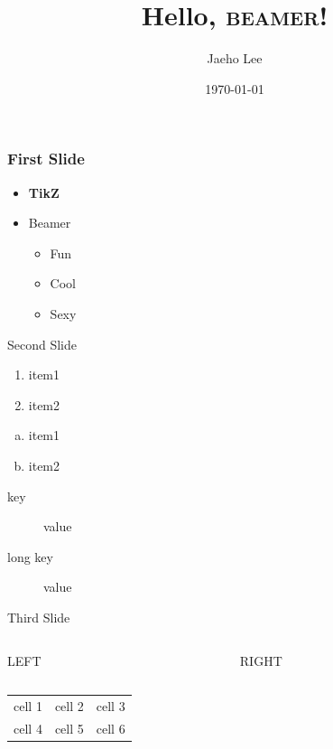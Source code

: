 \documentclass{beamer}
\title{Hello, \textsc{beamer}!}
\author{Jaeho Lee}
\date{\today}
\begin{document}
\maketitle
\begin{frame}[t]
  \frametitle{First Slide}
  \begin{itemize}
    \item<3> \textbf<1,2>{TikZ}
    \item<1-> Beamer
      \begin{itemize}
        \item<2> Fun
        \item<1,3> \alert<2->{Cool}
        \item<-2> Sexy
      \end{itemize}
  \end{itemize}
\end{frame}
\begin{frame}{Second Slide}
  \pause
  \begin{enumerate}
    \item item1
    \item item2
  \end{enumerate}
  \pause
  \begin{enumerate}[(a)]
    \item item1
    \pause
    \item item2
  \end{enumerate}
  \pause
  \begin{description}
    \item[key] value
    \item[long key] value
  \end{description}
\end{frame}
\begin{frame}{Third Slide}
  \begin{columns}
    \begin{column}{0.5\textwidth}
      \LARGE LEFT
    \end{column}
    \begin{column}{0.5\textwidth}
      \LARGE RIGHT
    \end{column}
  \end{columns}
  \vspace{2cm}
  \begin{center}
    \begin{tabular}{ccc}
      cell 1 & cell 2 & cell 3\\
      cell 4 & cell 5 & cell 6
    \end{tabular}
  \end{center}
\end{frame}
\end{document}
